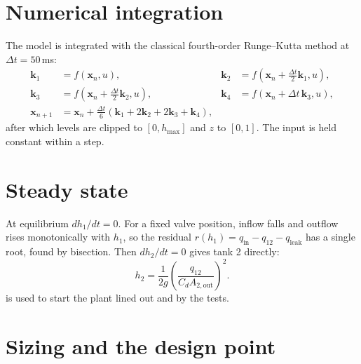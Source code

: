 \section{Numerical integration}

The model is integrated with the classical fourth-order Runge--Kutta method at
$\Delta t = 50$\,ms:
\begin{align*}
  \bm k_1 &= f(\bm x_n,u), &
  \bm k_2 &= f(\bm x_n + \tfrac{\Delta t}{2}\bm k_1,u),\\
  \bm k_3 &= f(\bm x_n + \tfrac{\Delta t}{2}\bm k_2,u), &
  \bm k_4 &= f(\bm x_n + \Delta t\,\bm k_3,u),\\
  \bm x_{n+1} &= \bm x_n + \tfrac{\Delta t}{6}(\bm k_1+2\bm k_2+2\bm k_3+\bm k_4),
\end{align*}
after which levels are clipped to $[0,h_\text{max}]$ and $z$ to $[0,1]$. The
input is held constant within a step.

\section{Steady state}

At equilibrium $dh_1/dt = 0$. For a fixed valve position, inflow falls and
outflow rises monotonically with $h_1$, so the residual
$r(h_1) = q_\text{in} - q_{12} - q_\text{leak}$ has a single root, found by
bisection. Then $dh_2/dt=0$ gives tank 2 directly:
\begin{equation}
  h_2 = \frac{1}{2g}\left(\frac{q_{12}}{C_dA_{2,\text{out}}}\right)^2 .
\end{equation}
 is used to start the plant lined out and by the tests.

\section{Sizing and the design point}

